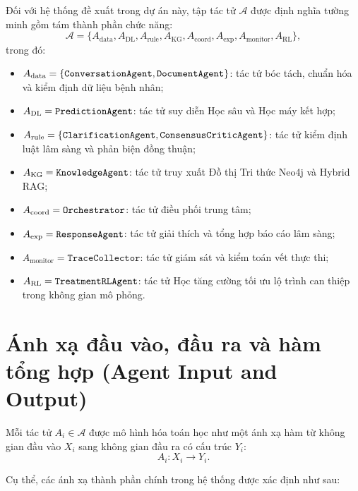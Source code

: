 Đối với hệ thống đề xuất trong dự án này, tập tác tử $\mathcal{A}$ được định nghĩa tường minh gồm tám thành phần chức năng:
\begin{equation}
  \mathcal{A} = \{A_{\text{data}}, A_{\text{DL}}, A_{\text{rule}}, A_{\text{KG}}, A_{\text{coord}}, A_{\text{exp}}, A_{\text{monitor}}, A_{\text{RL}}\},
  \label{eq:agent-set}
\end{equation}
trong đó:
\begin{itemize}
  \item $A_{\text{data}} = \{\texttt{ConversationAgent}, \texttt{DocumentAgent}\}$: tác tử bóc tách, chuẩn hóa và kiểm định dữ liệu bệnh nhân;
  \item $A_{\text{DL}} = \texttt{PredictionAgent}$: tác tử suy diễn Học sâu và Học máy kết hợp;
  \item $A_{\text{rule}} = \{\texttt{ClarificationAgent}, \texttt{ConsensusCriticAgent}\}$: tác tử kiểm định luật lâm sàng và phản biện đồng thuận;
  \item $A_{\text{KG}} = \texttt{KnowledgeAgent}$: tác tử truy xuất Đồ thị Tri thức Neo4j và Hybrid RAG;
  \item $A_{\text{coord}} = \texttt{Orchestrator}$: tác tử điều phối trung tâm;
  \item $A_{\text{exp}} = \texttt{ResponseAgent}$: tác tử giải thích và tổng hợp báo cáo lâm sàng;
  \item $A_{\text{monitor}} = \texttt{TraceCollector}$: tác tử giám sát và kiểm toán vết thực thi;
  \item $A_{\text{RL}} = \texttt{TreatmentRLAgent}$: tác tử Học tăng cường tối ưu lộ trình can thiệp trong không gian mô phỏng.
\end{itemize}

\section{Ánh xạ đầu vào, đầu ra và hàm tổng hợp (Agent Input and Output)}
\label{sec:agent-io}

Mỗi tác tử $A_i \in \mathcal{A}$ được mô hình hóa toán học như một ánh xạ hàm từ không gian đầu vào $X_i$ sang không gian đầu ra có cấu trúc $Y_i$:
\begin{equation}
  A_i : X_i \longrightarrow Y_i.
  \label{eq:agent-map}
\end{equation}

Cụ thể, các ánh xạ thành phần chính trong hệ thống được xác định như sau:

